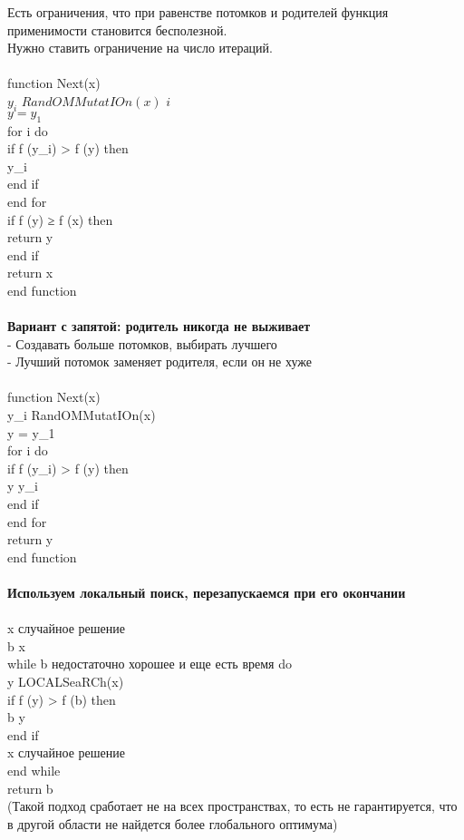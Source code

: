 Есть ограничения, что при равенстве потомков и родителей функция применимости становится бесполезной. \\
Нужно ставить ограничение на число итераций.\\
\\
function Next(x)  \\
\tab $y_i$ \leftarrow $RandOMMutatIOn(x)$  $i$ \in [1;λ]  \\
\tab $y = y_1$   \\
\tab for i \in [2;λ] do  \\
\tab \tab if f (y_i) > f (y) then  \\
\tab \tab \taby \leftarrow y_i   \\
\tab \tab end if \\ 
\tab end for  \\
\tab if f (y) ≥ f (x) then \\
\tab \tab return y  \\
\tab end if  \\
\tab return x  \\
end function \\
\\
\textbf{Вариант с запятой: родитель никогда не выживает}\\
- Создавать больше потомков, выбирать лучшего\\ 
- Лучший потомок заменяет родителя, если он не хуже \\
\\
function Next(x)  \\
\tab y_i \leftarrow RandOMMutatIOn(x)  \in [1;\lambda]  \\
\tab y = y_1  \\
\tab for i \in [2;\lambda] do  \\
\tab \tab if f (y_i) > f (y) then  \\
\tab \tab \tab y \leftarrow y_i   \\
\tab \tab end if  \\
\tab end for  \\
\tab return y  \\
end function \\
\\
\textbf{Используем локальный поиск, перезапускаемся при его окончании \\}
\\
x \leftarrow случайное решение  \\
b \leftarrow x \\ 
while b недостаточно хорошее и еще есть время do \\
\tab y \leftarrow LOCALSeaRCh(x)  \\
\tab if f (y) > f (b) then  \\
\tab \tab b \leftarrow y  \\
\tab end if  \\
\tab x \leftarrow случайное решение  \\
end while\\
return b\\

(Такой подход сработает не на всех пространствах, то есть не гарантируется, что в другой области не найдется более глобального оптимума)
